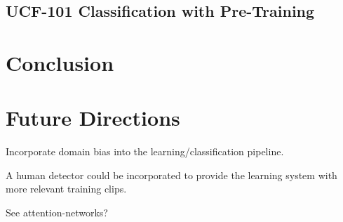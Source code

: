 \subsection{UCF-101 Classification with Pre-Training}


\section{Conclusion}


\section{Future Directions}
\label{sec:future_work}
Incorporate domain bias into the learning/classification pipeline.

A human detector could be incorporated to provide the learning system with more relevant training clips.

See attention-networks?
